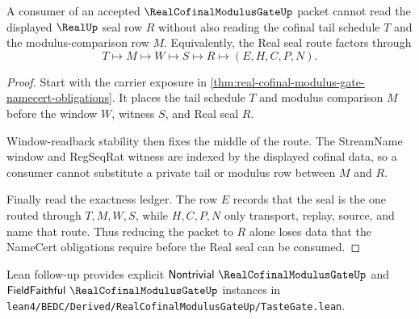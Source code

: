 \begin{theorem}
\label{thm:real-cofinal-modulus-gate-tail-cofinality-exactness}
A consumer of an accepted $\RealCofinalModulusGateUp$ packet cannot read the displayed $\RealUp$ seal row $R$ without also reading the cofinal tail schedule $T$ and the modulus-comparison row $M$. Equivalently, the Real seal route factors through
$$
T\longmapsto M\longmapsto W\longmapsto S\longmapsto R\longmapsto(E,H,C,P,N).
$$
\end{theorem}
\begin{proof}
Start with the carrier exposure in \autoref{thm:real-cofinal-modulus-gate-namecert-obligations}. It places the tail schedule $T$ and modulus comparison $M$ before the window $W$, witness $S$, and Real seal $R$.

Window-readback stability then fixes the middle of the route. The StreamName window and RegSeqRat witness are indexed by the displayed cofinal data, so a consumer cannot substitute a private tail or modulus row between $M$ and $R$.

Finally read the exactness ledger. The row $E$ records that the seal is the one routed through $T,M,W,S$, while $H,C,P,N$ only transport, replay, source, and name that route. Thus reducing the packet to $R$ alone loses data that the NameCert obligations require before the Real seal can be consumed.
\end{proof}



Lean follow-up provides explicit $\mathsf{Nontrivial}\ \RealCofinalModulusGateUp$ and $\mathsf{FieldFaithful}\ \RealCofinalModulusGateUp$ instances in \texttt{lean4/BEDC/Derived/RealCofinalModulusGateUp/TasteGate.lean}.


